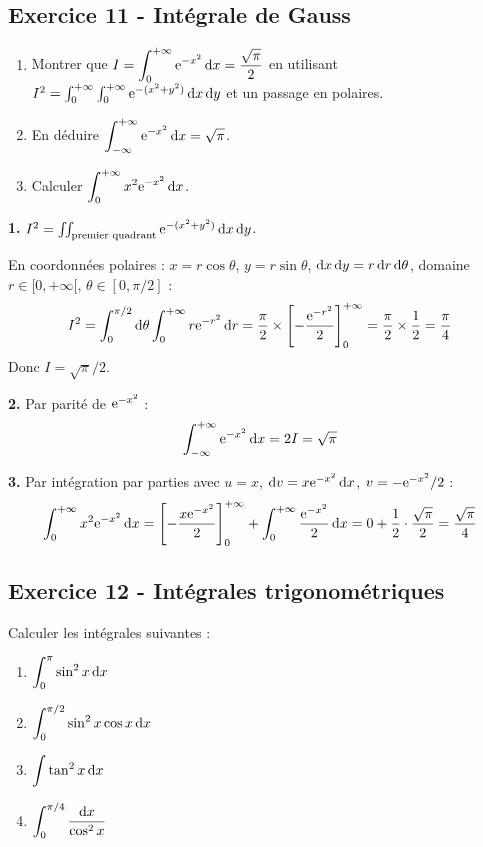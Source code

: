 \documentclass[12pt,a4paper]{article}
\begin{document}
\subsection*{Exercice 11 - Intégrale de Gauss \niveau{\difficile}}

\begin{boiteexercice}
\begin{enumerate}
  \item Montrer que $I = \displaystyle\int_0^{+\infty}\mathrm{e}^{-x^2}\,\mathrm{d} x = \frac{\sqrt{\pi}}{2}$ en utilisant $I^2 = \int_0^{+\infty}\int_0^{+\infty}\mathrm{e}^{-(x^2+y^2)}\,\mathrm{d} x\,\mathrm{d} y$ et un passage en polaires.
  \item En déduire $\displaystyle\int_{-\infty}^{+\infty}\mathrm{e}^{-x^2}\,\mathrm{d} x = \sqrt{\pi}$.
  \item Calculer $\displaystyle\int_0^{+\infty} x^2\mathrm{e}^{-x^2}\,\mathrm{d} x$.
\end{enumerate}
\end{boiteexercice}

\begin{boitecorrige}
\textbf{1.} $I^2 = \iint_{\text{premier quadrant}}\mathrm{e}^{-(x^2+y^2)}\,\mathrm{d} x\,\mathrm{d} y$.

En coordonnées polaires : $x = r\cos\theta$, $y = r\sin\theta$, $\mathrm{d} x\,\mathrm{d} y = r\,\mathrm{d} r\,\mathrm{d}\theta$, domaine $r\in[0,+\infty[$, $\theta\in[0,\pi/2]$ :
\[
I^2 = \int_0^{\pi/2}\mathrm{d}\theta\int_0^{+\infty}r\mathrm{e}^{-r^2}\,\mathrm{d} r = \frac{\pi}{2}\times\left[-\frac{\mathrm{e}^{-r^2}}{2}\right]_0^{+\infty} = \frac{\pi}{2}\times\frac{1}{2} = \frac{\pi}{4}
\]
Donc $I = \sqrt{\pi}/2$.

\textbf{2.} Par parité de $\mathrm{e}^{-x^2}$ :
\[
\int_{-\infty}^{+\infty}\mathrm{e}^{-x^2}\,\mathrm{d} x = 2I = \sqrt{\pi}
\]

\textbf{3.} Par intégration par parties avec $u = x$, $\mathrm{d} v = x\mathrm{e}^{-x^2}\,\mathrm{d} x$, $v = -\mathrm{e}^{-x^2}/2$ :
\[
\int_0^{+\infty} x^2\mathrm{e}^{-x^2}\,\mathrm{d} x = \left[-\frac{x\mathrm{e}^{-x^2}}{2}\right]_0^{+\infty} + \int_0^{+\infty}\frac{\mathrm{e}^{-x^2}}{2}\,\mathrm{d} x = 0+\frac{1}{2}\cdot\frac{\sqrt{\pi}}{2} = \frac{\sqrt{\pi}}{4}
\]
\end{boitecorrige}

\subsection*{Exercice 12 - Intégrales trigonométriques \niveau{\moyen}}

\begin{boiteexercice}
Calculer les intégrales suivantes :
\begin{enumerate}[label=(\alph*)]
  \item $\displaystyle\int_0^{\pi}\sin^2 x\,\mathrm{d} x$
  \item $\displaystyle\int_0^{\pi/2}\sin^2 x\cos x\,\mathrm{d} x$
  \item $\displaystyle\int\tan^2 x\,\mathrm{d} x$
  \item $\displaystyle\int_0^{\pi/4}\frac{\mathrm{d} x}{\cos^2 x}$
\end{enumerate}
\end{boiteexercice}
\end{document}
